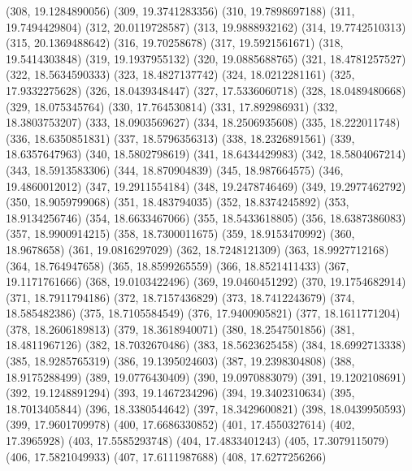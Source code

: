 {					(308, 19.1284890056)
					(309, 19.3741283356)
					(310, 19.7898697188)
					(311, 19.7494429804)
					(312, 20.0119728587)
					(313, 19.9888932162)
					(314, 19.7742510313)
					(315, 20.1369488642)
					(316, 19.70258678)
					(317, 19.5921561671)
					(318, 19.5414303848)
					(319, 19.1937955132)
					(320, 19.0885688765)
					(321, 18.4781257527)
					(322, 18.5634590333)
					(323, 18.4827137742)
					(324, 18.0212281161)
					(325, 17.9332275628)
					(326, 18.0439348447)
					(327, 17.5336060718)
					(328, 18.0489480668)
					(329, 18.075345764)
					(330, 17.764530814)
					(331, 17.892986931)
					(332, 18.3803753207)
					(333, 18.0903569627)
					(334, 18.2506935608)
					(335, 18.222011748)
					(336, 18.6350851831)
					(337, 18.5796356313)
					(338, 18.2326891561)
					(339, 18.6357647963)
					(340, 18.5802798619)
					(341, 18.6434429983)
					(342, 18.5804067214)
					(343, 18.5913583306)
					(344, 18.870904839)
					(345, 18.987664575)
					(346, 19.4860012012)
					(347, 19.2911554184)
					(348, 19.2478746469)
					(349, 19.2977462792)
					(350, 18.9059799068)
					(351, 18.483794035)
					(352, 18.8374245892)
					(353, 18.9134256746)
					(354, 18.6633467066)
					(355, 18.5433618805)
					(356, 18.6387386083)
					(357, 18.9900914215)
					(358, 18.7300011675)
					(359, 18.9153470992)
					(360, 18.9678658)
					(361, 19.0816297029)
					(362, 18.7248121309)
					(363, 18.9927712168)
					(364, 18.764947658)
					(365, 18.8599265559)
					(366, 18.8521411433)
					(367, 19.1171761666)
					(368, 19.0103422496)
					(369, 19.0460451292)
					(370, 19.1754682914)
					(371, 18.7911794186)
					(372, 18.7157436829)
					(373, 18.7412243679)
					(374, 18.585482386)
					(375, 18.7105584549)
					(376, 17.9400905821)
					(377, 18.1611771204)
					(378, 18.2606189813)
					(379, 18.3618940071)
					(380, 18.2547501856)
					(381, 18.4811967126)
					(382, 18.7032670486)
					(383, 18.5623625458)
					(384, 18.6992713338)
					(385, 18.9285765319)
					(386, 19.1395024603)
					(387, 19.2398304808)
					(388, 18.9175288499)
					(389, 19.0776430409)
					(390, 19.0970883079)
					(391, 19.1202108691)
					(392, 19.1248891294)
					(393, 19.1467234296)
					(394, 19.3402310634)
					(395, 18.7013405844)
					(396, 18.3380544642)
					(397, 18.3429600821)
					(398, 18.0439950593)
					(399, 17.9601709978)
					(400, 17.6686330852)
					(401, 17.4550327614)
					(402, 17.3965928)
					(403, 17.5585293748)
					(404, 17.4833401243)
					(405, 17.3079115079)
					(406, 17.5821049933)
					(407, 17.6111987688)
					(408, 17.6277256266)
}
